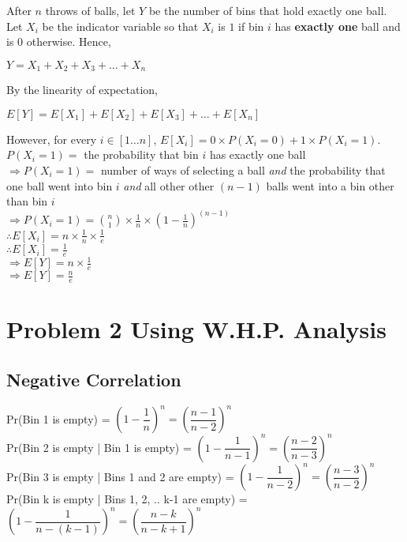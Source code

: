 \documentclass{article}
\begin{document}
After $n$ throws of balls, let $Y$ be the number of bins that hold
exactly one ball. Let $X_i$ be the indicator variable so that $X_i$ is
$1$ if bin $i$ has \textbf{exactly one} ball and is $0$
otherwise. Hence,

$Y = X_1 + X_2 + X_3 + \ldots{} + X_n$

By the linearity of expectation,

$E[Y] = E[X_1] + E[X_2] + E[X_3] + \ldots{} + E[X_n]$

However, for every $i \in [1\ldots{}n]$, $E[X_i] = 0 \times P(X_i = 0)
+ 1 \times P(X_i = 1)$.\\
$P(X_i = 1) = $ the probability that bin $i$ has exactly one ball\\
$\Rightarrow P(X_i = 1) = $ number of ways of selecting a ball \textit{and} the probability that one ball went into
bin $i$ \textit{and} all other other $(n-1)$ balls went into a bin other than
bin $i$\\
$\Rightarrow P(X_i = 1) = \binom{n}{1} \times \frac{1}{n} \times (1 - \frac{1}{n})^{(n-1)}$\\
$\therefore E[X_i] = n \times \frac{1}{n} \times \frac{1}{e}$\\
$\therefore E[X_i] = \frac{1}{e}$\\
$\Rightarrow E[Y] = n \times \frac{1}{e}$\\
$\Rightarrow E[Y] = \frac{n}{e}$

\clearpage

\section {Problem 2 Using W.H.P. Analysis}

\subsection{Negative Correlation}
Pr(Bin 1 is empty) = $\left(1-\dfrac{1}{n}\right)^n = \left(\dfrac{n-1}{n-2}\right)^n$\\
Pr(Bin 2 is empty | Bin 1 is empty) = $\left(1-\dfrac{1}{n-1}\right)^n = \left(\dfrac{n-2}{n-3}\right)^n$\\
Pr(Bin 3 is empty | Bins 1 and 2 are empty) = $\left(1-\dfrac{1}{n-2}\right)^n = \left(\dfrac{n-3}{n-2}\right)^n$\\
Pr(Bin k is empty | Bins 1, 2, .. k-1 are empty) = $\left(1-\dfrac{1}{n-(k-1)}\right)^n = \left(\dfrac{n-k}{n-k+1}\right)^n$\\
\end{document}
